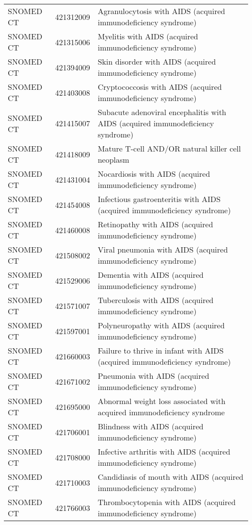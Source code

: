 \begin{table}[ht]
\begin{tabular}{lll}
  SNOMED CT & 421312009 & Agranulocytosis with AIDS (acquired immunodeficiency syndrome) \\ 
  SNOMED CT & 421315006 & Myelitis with AIDS (acquired immunodeficiency syndrome) \\ 
  SNOMED CT & 421394009 & Skin disorder with AIDS (acquired immunodeficiency syndrome) \\ 
  SNOMED CT & 421403008 & Cryptococcosis with AIDS (acquired immunodeficiency syndrome) \\ 
  SNOMED CT & 421415007 & Subacute adenoviral encephalitis with AIDS (acquired immunodeficiency syndrome) \\ 
  SNOMED CT & 421418009 & Mature T-cell AND/OR natural killer cell neoplasm \\ 
  SNOMED CT & 421431004 & Nocardiosis with AIDS (acquired immunodeficiency syndrome) \\ 
  SNOMED CT & 421454008 & Infectious gastroenteritis with AIDS (acquired immunodeficiency syndrome) \\ 
  SNOMED CT & 421460008 & Retinopathy with AIDS (acquired immunodeficiency syndrome) \\ 
  SNOMED CT & 421508002 & Viral pneumonia with AIDS (acquired immunodeficiency syndrome) \\ 
  SNOMED CT & 421529006 & Dementia with AIDS (acquired immunodeficiency syndrome) \\ 
  SNOMED CT & 421571007 & Tuberculosis with AIDS (acquired immunodeficiency syndrome) \\ 
  SNOMED CT & 421597001 & Polyneuropathy with AIDS (acquired immunodeficiency syndrome) \\ 
  SNOMED CT & 421660003 & Failure to thrive in infant with AIDS (acquired immunodeficiency syndrome) \\ 
  SNOMED CT & 421671002 & Pneumonia with AIDS (acquired immunodeficiency syndrome) \\ 
  SNOMED CT & 421695000 & Abnormal weight loss associated with acquired immunodeficiency syndrome \\ 
  SNOMED CT & 421706001 & Blindness with AIDS (acquired immunodeficiency syndrome) \\ 
  SNOMED CT & 421708000 & Infective arthritis with AIDS (acquired immunodeficiency syndrome) \\ 
  SNOMED CT & 421710003 & Candidiasis of mouth with AIDS (acquired immunodeficiency syndrome) \\ 
  SNOMED CT & 421766003 & Thrombocytopenia with AIDS (acquired immunodeficiency syndrome) \\ 

\end{tabular}
\end{table}
